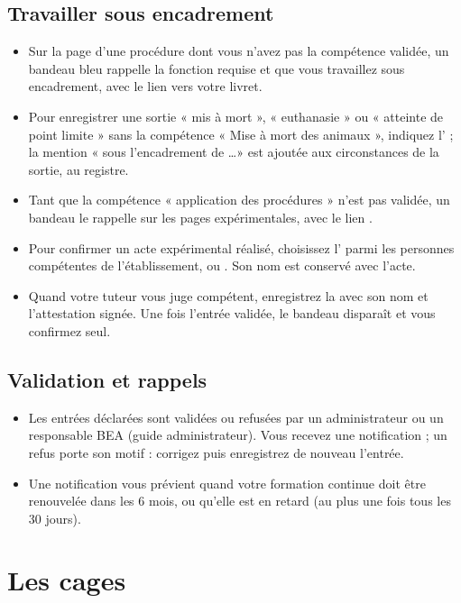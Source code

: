 \documentclass[11pt,a4paper]{article}
\begin{document}
\subsection{Travailler sous encadrement}
\begin{itemize}
  \item Sur la page d'une procédure dont vous n'avez pas la compétence
    validée, un bandeau bleu  rappelle la fonction
    requise et que vous travaillez sous encadrement, avec le lien vers votre
    livret.
  \item Pour enregistrer une sortie « mis à mort », « euthanasie » ou
    « atteinte de point limite » sans la compétence « Mise à mort des
    animaux », indiquez l' ; la mention
    « sous l'encadrement de \ldots » est ajoutée aux circonstances de la
    sortie, au registre.
  \item Tant que la compétence « application des procédures » n'est pas
    validée, un bandeau  le rappelle sur les
    pages expérimentales, avec le lien .
  \item Pour confirmer un acte expérimental réalisé, choisissez
    l' parmi les personnes compétentes de
    l'établissement, ou . Son nom est conservé avec
    l'acte.
  \item Quand votre tuteur vous juge compétent, enregistrez la
     avec son nom et l'attestation signée. Une fois
    l'entrée validée, le bandeau disparaît et vous confirmez seul.
\end{itemize}

\subsection{Validation et rappels}
\begin{itemize}
  \item Les entrées déclarées sont validées ou refusées par un
    administrateur ou un responsable BEA (guide administrateur). Vous recevez
    une notification ; un refus porte son motif : corrigez puis
    enregistrez de nouveau l'entrée.
  \item Une notification vous prévient quand votre formation continue doit
    être renouvelée dans les 6 mois, ou qu'elle est en retard (au plus une
    fois tous les 30 jours).
\end{itemize}

\section{Les cages}\label{sec:cages}
\end{document}
